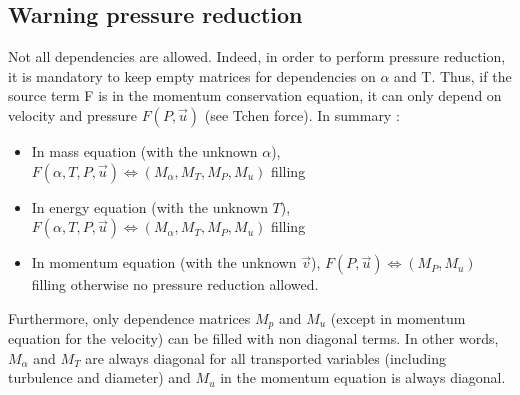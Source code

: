 \subsection*{\color{red} Warning pressure reduction}
Not all dependencies are allowed. Indeed, in order to perform pressure reduction, it is mandatory to keep empty matrices for dependencies on $\alpha$ and T. Thus, if the source term F is in the momentum conservation equation, it can only depend on velocity and pressure $F(P,\vec{u})$ (see Tchen force). In summary :
\begin{itemize}
\item[\small \textcolor{blue}{\ding{109}}] In mass equation (with the unknown $\alpha$), $F(\alpha, T, P, \vec{u})  \Leftrightarrow (M_\alpha,M_T, M_P,M_u)$ filling
\item[\small \textcolor{blue}{\ding{109}}] In energy equation (with the unknown $T$), $F(\alpha, T, P, \vec{u}) \Leftrightarrow (M_\alpha,M_T, M_P,M_u)$ filling
\item[\small \textcolor{blue}{\ding{109}}] In momentum equation (with the unknown $\vec{v}$), $F(P, \vec{u}) \Leftrightarrow (M_P,M_u)$ filling otherwise no pressure reduction allowed.
\end{itemize}
Furthermore, only dependence matrices $M_p$ and $M_u$ (except in momentum equation for the velocity) can be filled with non diagonal terms. In other words, $M_\alpha$ and $M_T$ are always diagonal for all transported variables (including turbulence and diameter) and $M_u$ in the momentum equation is always diagonal.


